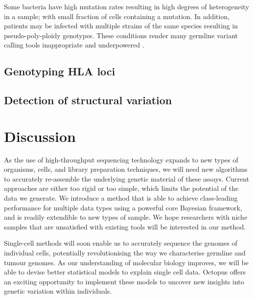 \documentclass[notitlepage, twocolumn]{article}
\begin{document}
Some bacteria have high mutation rates resulting in high degrees of heterogeneity in a sample; with small fraction of cells containing a mutation. In addition, patients may be infected with multiple strains of the same species resulting in pseudo-poly-ploidy genotypes. These conditions render many germline variant calling tools inappropriate and underpowered \cite{microbial-snp-callling}.

\subsection*{Genotyping HLA loci}

\subsection*{Detection of structural variation}

\section*{Discussion}

As the use of high-throughput sequencing technology expands to new types of organisms, cells, and library preparation techniques, we will need new algorithms to accurately re-assemble the underlying genetic material of these assays. Current approaches are either too rigid or too simple, which limits the potential of the data we generate. We introduce a method that is able to achieve class-leading performance for multiple data types using a powerful core Bayesian framework, and is readily extendible to new types of sample. We hope researchers with niche samples that are unsatisfied with existing tools will be interested in our method.

Single-cell methods will soon enable us to accurately sequence the genomes of individual cells, potentially revolutionising the way we characterise germline and tumour genomes. As our understanding of molecular biology improves, we will be able to devise better statistical models to explain single cell data. Octopus offers an exciting opportunity to implement these models to uncover new insights into genetic variation within individuals.
\end{document}
